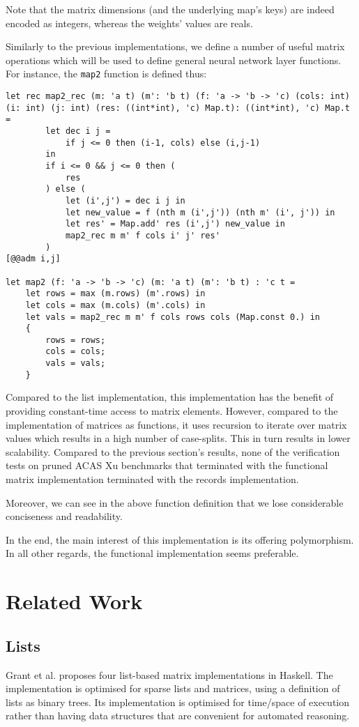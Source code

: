 \documentclass[runningheads]{llncs}
\begin{document}
Note that the matrix dimensions (and the underlying map's keys) are indeed encoded as integers, whereas the weights' values are reals. 

Similarly to the previous implementations, we define a number of useful matrix operations which will be used to define general neural network layer functions. For instance, the \lstinline{map2} function is defined thus:

\begin{lstlisting}[language=caml, label={lst:map2_records}]
let rec map2_rec (m: 'a t) (m': 'b t) (f: 'a -> 'b -> 'c) (cols: int) (i: int) (j: int) (res: ((int*int), 'c) Map.t): ((int*int), 'c) Map.t =
		let dec i j = 
			if j <= 0 then (i-1, cols) else (i,j-1)     
		in
		if i <= 0 && j <= 0 then (
			res
		) else (
			let (i',j') = dec i j in
			let new_value = f (nth m (i',j')) (nth m' (i', j')) in
			let res' = Map.add' res (i',j') new_value in
			map2_rec m m' f cols i' j' res'
		)
[@@adm i,j]

let map2 (f: 'a -> 'b -> 'c) (m: 'a t) (m': 'b t) : 'c t = 
	let rows = max (m.rows) (m'.rows) in
	let cols = max (m.cols) (m'.cols) in
	let vals = map2_rec m m' f cols rows cols (Map.const 0.) in
	{
		rows = rows;
		cols = cols;
		vals = vals;
	}
\end{lstlisting} 

Compared to the list implementation, this implementation has the benefit of providing constant-time access to matrix elements. However, compared to the implementation of matrices as functions, it uses recursion to iterate over matrix values which results in a high number of case-splits. This in turn results in lower scalability.
Compared to the previous section's results, none of the verification tests on pruned ACAS Xu benchmarks that terminated with the functional matrix implementation terminated with the records implementation.

Moreover, we can see in the above function definition that we lose considerable conciseness and readability.

In the end, the main interest of this implementation is its offering polymorphism. In all other regards, the functional implementation seems preferable.

\iffalse
\section{Related Work}
\subsection{Lists}
Grant et al. \cite{grant_sparse_1996} proposes four list-based matrix implementations in Haskell. The implementation is optimised for sparse lists and matrices, using a definition of lists as binary trees. Its implementation is optimised for time/space of execution rather than having data structures that are convenient for automated reasoning.
\end{document}

